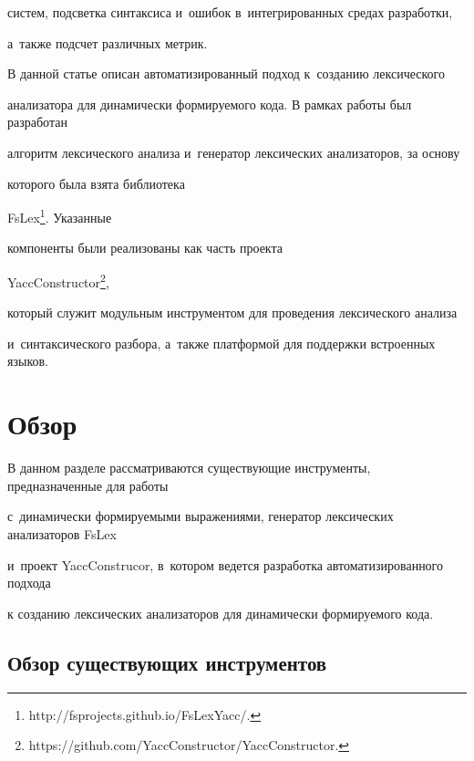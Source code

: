 систем, подсветка синтаксиса и~ошибок в~интегрированных средах разработки, 


а~также подсчет различных метрик.





В данной статье описан автоматизированный подход к~созданию лексического 


анализатора для динамически формируемого кода. В рамках работы был разработан 


алгоритм лексического анализа и~генератор лексических анализаторов,  за основу 


которого была взята библиотека 


FsLex\footnote{\sf http://fsprojects.github.io/FsLexYacc/.}. Указанные 


компоненты были реализованы как часть проекта  


YaccConstructor\footnote{\sf https://github.com/YaccConstructor/YaccConstructor.}, 


который служит модульным инструментом для проведения лексического анализа 


и~синтаксического разбора, а~также платформой для поддержки встроенных языков.





\section{Обзор}





В данном разделе рассматриваются существующие инструменты, предназначенные для работы 


с~динамически формируемыми выражениями, генератор лексических анализаторов FsLex 


и~проект YaccConstrucor, в~котором ведется разработка автоматизированного подхода 


к созданию лексических анализаторов для динамически формируемого кода.








\subsection{Обзор существующих инструментов}





